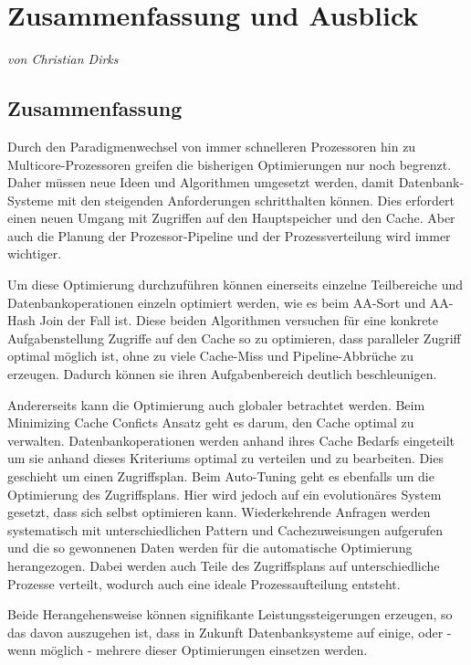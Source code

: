 \chapter{Zusammenfassung und Ausblick}
\label{sec:Zusammenfassung-Ausblick}
\textit{von Christian Dirks}

\section{Zusammenfassung}
\label{sec:Zusammenfassung}

Durch den Paradigmenwechsel von immer schnelleren Prozessoren hin zu Multicore-Prozessoren greifen die bisherigen Optimierungen nur noch begrenzt. Daher müssen neue Ideen und Algorithmen umgesetzt werden, damit Datenbank-Systeme mit den steigenden Anforderungen schritthalten können. Dies erfordert einen neuen Umgang mit Zugriffen auf den Hauptspeicher und den Cache. Aber auch die Planung der Prozessor-Pipeline und der Prozessverteilung wird immer wichtiger.

Um diese Optimierung durchzuführen können einerseits einzelne Teilbereiche und Datenbankoperationen einzeln optimiert werden, wie es beim AA-Sort und AA-Hash Join der Fall ist. Diese beiden Algorithmen versuchen für eine konkrete Aufgabenstellung Zugriffe auf den Cache so zu optimieren, dass paralleler Zugriff optimal möglich ist, ohne zu viele Cache-Miss und Pipeline-Abbrüche zu erzeugen. Dadurch können sie ihren Aufgabenbereich deutlich beschleunigen.

Andererseits kann die Optimierung auch globaler betrachtet werden. Beim Minimizing Cache Conficts Ansatz geht es darum, den Cache optimal zu verwalten. Datenbankoperationen werden anhand ihres Cache Bedarfs eingeteilt um sie anhand dieses Kriteriums optimal zu verteilen und zu bearbeiten. Dies geschieht um einen Zugriffsplan. Beim Auto-Tuning geht es ebenfalls um die Optimierung des Zugriffsplans. Hier wird jedoch auf ein evolutionäres System gesetzt, dass sich selbst optimieren kann. Wiederkehrende Anfragen werden systematisch mit unterschiedlichen Pattern und Cachezuweisungen aufgerufen und die so gewonnenen Daten werden für die automatische Optimierung herangezogen. Dabei werden auch Teile des Zugriffsplans auf unterschiedliche Prozesse verteilt, wodurch auch eine ideale Prozessaufteilung entsteht.

Beide Herangehensweise können signifikante Leistungssteigerungen erzeugen, so das davon auszugehen ist, dass in Zukunft Datenbanksysteme auf einige, oder - wenn möglich - mehrere dieser Optimierungen einsetzen werden.


